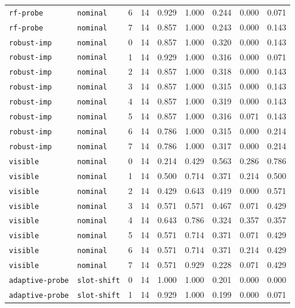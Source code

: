 \documentclass{article}
\begin{document}
\begin{center}
{\begin{tabular}{llllccccc}
\texttt{rf-probe} & \texttt{nominal} & 6 & 14 & 0.929 & 1.000 & 0.244 & 0.000 & 0.071 \\
\texttt{rf-probe} & \texttt{nominal} & 7 & 14 & 0.857 & 1.000 & 0.243 & 0.000 & 0.143 \\
\texttt{robust-imp} & \texttt{nominal} & 0 & 14 & 0.857 & 1.000 & 0.320 & 0.000 & 0.143 \\
\texttt{robust-imp} & \texttt{nominal} & 1 & 14 & 0.929 & 1.000 & 0.316 & 0.000 & 0.071 \\
\texttt{robust-imp} & \texttt{nominal} & 2 & 14 & 0.857 & 1.000 & 0.318 & 0.000 & 0.143 \\
\texttt{robust-imp} & \texttt{nominal} & 3 & 14 & 0.857 & 1.000 & 0.315 & 0.000 & 0.143 \\
\texttt{robust-imp} & \texttt{nominal} & 4 & 14 & 0.857 & 1.000 & 0.319 & 0.000 & 0.143 \\
\texttt{robust-imp} & \texttt{nominal} & 5 & 14 & 0.857 & 1.000 & 0.316 & 0.071 & 0.143 \\
\texttt{robust-imp} & \texttt{nominal} & 6 & 14 & 0.786 & 1.000 & 0.315 & 0.000 & 0.214 \\
\texttt{robust-imp} & \texttt{nominal} & 7 & 14 & 0.786 & 1.000 & 0.317 & 0.000 & 0.214 \\
\texttt{visible} & \texttt{nominal} & 0 & 14 & 0.214 & 0.429 & 0.563 & 0.286 & 0.786 \\
\texttt{visible} & \texttt{nominal} & 1 & 14 & 0.500 & 0.714 & 0.371 & 0.214 & 0.500 \\
\texttt{visible} & \texttt{nominal} & 2 & 14 & 0.429 & 0.643 & 0.419 & 0.000 & 0.571 \\
\texttt{visible} & \texttt{nominal} & 3 & 14 & 0.571 & 0.571 & 0.467 & 0.071 & 0.429 \\
\texttt{visible} & \texttt{nominal} & 4 & 14 & 0.643 & 0.786 & 0.324 & 0.357 & 0.357 \\
\texttt{visible} & \texttt{nominal} & 5 & 14 & 0.571 & 0.714 & 0.371 & 0.071 & 0.429 \\
\texttt{visible} & \texttt{nominal} & 6 & 14 & 0.571 & 0.714 & 0.371 & 0.214 & 0.429 \\
\texttt{visible} & \texttt{nominal} & 7 & 14 & 0.571 & 0.929 & 0.228 & 0.071 & 0.429 \\
\texttt{adaptive-probe} & \texttt{slot-shift} & 0 & 14 & 1.000 & 1.000 & 0.201 & 0.000 & 0.000 \\
\texttt{adaptive-probe} & \texttt{slot-shift} & 1 & 14 & 0.929 & 1.000 & 0.199 & 0.000 & 0.071 \\
\bottomrule
\end{tabular}%
}
\end{center}
\end{document}
